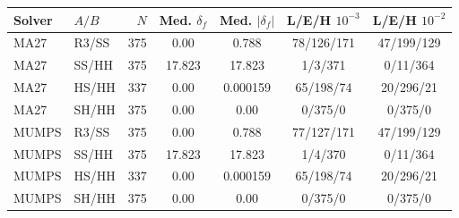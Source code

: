 \begin{tabular}{@{}llrcccc@{}}
\toprule
Solver & $A/B$ & $N$ & Med. $\delta_f$ & Med. $|\delta_f|$ & L/E/H $10^{-3}$ & L/E/H $10^{-2}$\\
\midrule
MA27 & R3/SS & 375 & 0.00 & 0.788 & 78/126/171 & 47/199/129\\
MA27 & SS/HH & 375 & 17.823 & 17.823 & 1/3/371 & 0/11/364\\
MA27 & HS/HH & 337 & 0.00 & 0.000159 & 65/198/74 & 20/296/21\\
MA27 & SH/HH & 375 & 0.00 & 0.00 & 0/375/0 & 0/375/0\\
\addlinespace
MUMPS & R3/SS & 375 & 0.00 & 0.788 & 77/127/171 & 47/199/129\\
MUMPS & SS/HH & 375 & 17.823 & 17.823 & 1/4/370 & 0/11/364\\
MUMPS & HS/HH & 337 & 0.00 & 0.000159 & 65/198/74 & 20/296/21\\
MUMPS & SH/HH & 375 & 0.00 & 0.00 & 0/375/0 & 0/375/0\\
\bottomrule
\end{tabular}
